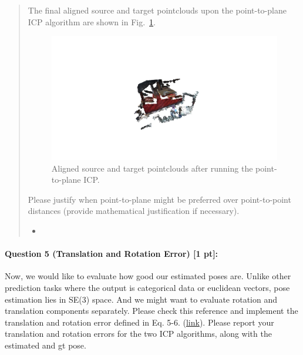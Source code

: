 \documentclass[11pt]{article}
\begin{document}
\begin{quote}
The final aligned source and target pointclouds upon the point-to-plane ICP algorithm are shown in Fig.~\ref{fig:pcds_icp_point2plane}.
\begin{figure}[h]
    \centering
    \includegraphics[width=1.0\linewidth]{pcds_icp_point2plane.jpg}
    \caption{Aligned source and target pointclouds after running the point-to-plane ICP.}
    \label{fig:pcds_icp_point2plane}
\end{figure}

\color{red}

Please justify when point-to-plane might be preferred over point-to-point distances (provide mathematical justification if necessary).

\begin{itemize}
    \item 
\end{itemize}

\end{quote}


\paragraph{Question 5 (Translation and Rotation Error) [1 pt]:} Now, we would like to evaluate how good our estimated poses are. Unlike other prediction tasks where the output is categorical data or euclidean vectors, pose estimation lies in SE(3) space. And we might want to evaluate rotation and translation components separately. Please check this reference and implement the translation and rotation error defined in Eq. 5-6. (\href{https://cmp.felk.cvut.cz/~hodanto2/data/hodan2016evaluation.pdf}{link}). Please report your translation and rotation errors for the two ICP algorithms, along with the estimated and gt pose.  
\end{document}

